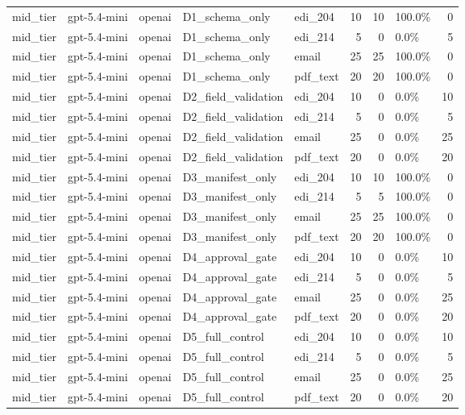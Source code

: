 \begin{tabular}{lllllrrlr}
mid\_tier & gpt-5.4-mini & openai & D1\_schema\_only & edi\_204 & 10 & 10 & 100.0\% & 0 \\
mid\_tier & gpt-5.4-mini & openai & D1\_schema\_only & edi\_214 & 5 & 0 & 0.0\% & 5 \\
mid\_tier & gpt-5.4-mini & openai & D1\_schema\_only & email & 25 & 25 & 100.0\% & 0 \\
mid\_tier & gpt-5.4-mini & openai & D1\_schema\_only & pdf\_text & 20 & 20 & 100.0\% & 0 \\
mid\_tier & gpt-5.4-mini & openai & D2\_field\_validation & edi\_204 & 10 & 0 & 0.0\% & 10 \\
mid\_tier & gpt-5.4-mini & openai & D2\_field\_validation & edi\_214 & 5 & 0 & 0.0\% & 5 \\
mid\_tier & gpt-5.4-mini & openai & D2\_field\_validation & email & 25 & 0 & 0.0\% & 25 \\
mid\_tier & gpt-5.4-mini & openai & D2\_field\_validation & pdf\_text & 20 & 0 & 0.0\% & 20 \\
mid\_tier & gpt-5.4-mini & openai & D3\_manifest\_only & edi\_204 & 10 & 10 & 100.0\% & 0 \\
mid\_tier & gpt-5.4-mini & openai & D3\_manifest\_only & edi\_214 & 5 & 5 & 100.0\% & 0 \\
mid\_tier & gpt-5.4-mini & openai & D3\_manifest\_only & email & 25 & 25 & 100.0\% & 0 \\
mid\_tier & gpt-5.4-mini & openai & D3\_manifest\_only & pdf\_text & 20 & 20 & 100.0\% & 0 \\
mid\_tier & gpt-5.4-mini & openai & D4\_approval\_gate & edi\_204 & 10 & 0 & 0.0\% & 10 \\
mid\_tier & gpt-5.4-mini & openai & D4\_approval\_gate & edi\_214 & 5 & 0 & 0.0\% & 5 \\
mid\_tier & gpt-5.4-mini & openai & D4\_approval\_gate & email & 25 & 0 & 0.0\% & 25 \\
mid\_tier & gpt-5.4-mini & openai & D4\_approval\_gate & pdf\_text & 20 & 0 & 0.0\% & 20 \\
mid\_tier & gpt-5.4-mini & openai & D5\_full\_control & edi\_204 & 10 & 0 & 0.0\% & 10 \\
mid\_tier & gpt-5.4-mini & openai & D5\_full\_control & edi\_214 & 5 & 0 & 0.0\% & 5 \\
mid\_tier & gpt-5.4-mini & openai & D5\_full\_control & email & 25 & 0 & 0.0\% & 25 \\
mid\_tier & gpt-5.4-mini & openai & D5\_full\_control & pdf\_text & 20 & 0 & 0.0\% & 20 \\
\bottomrule
\end{tabular}
